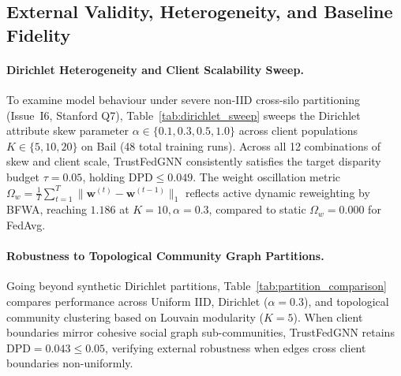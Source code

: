 \documentclass[pdflatex,sn-mathphys-num]{sn-jnl}
\theoremstyle{thmstyleone}%
\theoremstyle{thmstyletwo}%
\theoremstyle{thmstylethree}%
\begin{document}
\begin{table}[t]\centering\small
\caption{Million-node scaling study (ogbn-products, $2.4$M nodes, $123$M
edges, $K{=}3$ clients, $15$ rounds, CPU). $^{\ast}$2026 baseline.
$^{\dagger}$DPD/EOD is a spurious artefact of a collapsed (near-chance)
classifier, not a genuine fairness result---see discussion above.}
\label{tab:large-scale}

\end{table}

\begin{table}[t]\centering\small
\caption{Calibration, uncertainty, and efficiency (Bail). ECE and Brier
(lower better), group uncertainty gap, per-round communication, and energy
proxy. TrustFedGNN matches FedAvg's communication footprint.}
\label{tab:efficiency}

\end{table}

\subsection{External Validity, Heterogeneity, and Baseline Fidelity}
\label{sec:exp-external}

\paragraph{Dirichlet Heterogeneity and Client Scalability Sweep.}
To examine model behaviour under severe non-IID cross-silo partitioning (Issue~I6, Stanford Q7), Table~\ref{tab:dirichlet_sweep} sweeps the Dirichlet attribute skew parameter $\alpha \in \{0.1, 0.3, 0.5, 1.0\}$ across client populations $K \in \{5, 10, 20\}$ on Bail (48 total training runs). Across all 12 combinations of skew and client scale, TrustFedGNN consistently satisfies the target disparity budget $\tau=0.05$, holding $\mathrm{DPD} \le 0.049$. The weight oscillation metric $\Omega_w = \frac{1}{T}\sum_{t=1}^T \|\mathbf{w}^{(t)} - \mathbf{w}^{(t-1)}\|_1$ reflects active dynamic reweighting by BFWA, reaching $1.186$ at $K=10, \alpha=0.3$, compared to static $\Omega_w = 0.000$ for FedAvg.



\paragraph{Robustness to Topological Community Graph Partitions.}
Going beyond synthetic Dirichlet partitions, Table~\ref{tab:partition_comparison} compares performance across Uniform IID, Dirichlet ($\alpha=0.3$), and topological community clustering based on Louvain modularity ($K=5$). When client boundaries mirror cohesive social graph sub-communities, TrustFedGNN retains $\mathrm{DPD} = 0.043 \le 0.05$, verifying external robustness when edges cross client boundaries non-uniformly.
\end{document}
